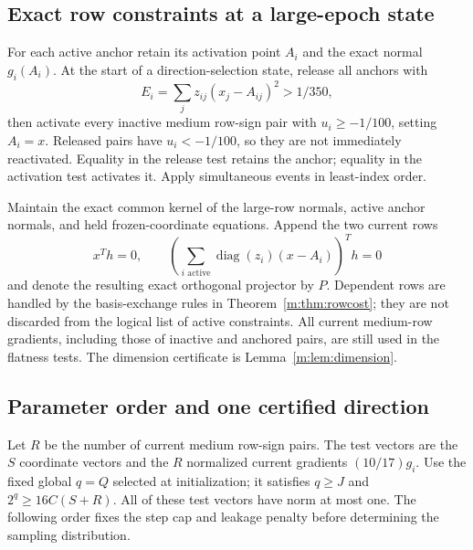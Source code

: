 \documentclass[11pt]{amsart}
\theoremstyle{definition}\newtheorem{definition}[theorem]{Definition}
\theoremstyle{remark}\newtheorem{remark}[theorem]{Remark}
\numberwithin{equation}{section}
\begin{document}
\subsection{Exact row constraints at a large-epoch state}\label{a:rows}
For each active anchor retain its activation point $A_i$ and the exact
normal $g_i(A_i)$. At the start of a direction-selection state, release all
anchors with
\[
 E_i=\sum_jz_{ij}(x_j-A_{ij})^2>1/350,
\]
then activate every inactive medium row-sign pair with $u_i\ge-1/100$,
setting $A_i=x$. Released pairs have $u_i<-1/100$, so they are not
immediately reactivated. Equality in the release test retains the anchor;
equality in the activation test activates it. Apply simultaneous events
in least-index order.

Maintain the exact common kernel of the large-row normals, active anchor
normals, and held frozen-coordinate equations. Append the two current
rows
\[
 x^Th=0,\qquad
 \left(\sum_{i\text{ active}}\operatorname{diag}(z_i)(x-A_i)\right)^Th=0
\]
and denote the resulting exact orthogonal projector by $P$.
Dependent rows are handled by the basis-exchange rules in
Theorem~\ref{m:thm:rowcost}; they are not discarded from the logical list
of active constraints. All current medium-row gradients, including those
of inactive and anchored pairs, are still used in the flatness tests.
The dimension certificate is Lemma~\ref{m:lem:dimension}.

\subsection{Parameter order and one certified direction}\label{a:direction}
Let $R$ be the number of current medium row-sign pairs. The test vectors
are the $S$ coordinate vectors and the $R$ normalized current gradients
$(10/17)g_i$. Use the fixed global $q=Q$ selected at initialization;
it satisfies $q\ge J$ and $2^q\ge16C(S+R)$. All of these test vectors
have norm at most one.
The following order fixes the step cap and leakage penalty before
determining the sampling distribution.
\end{document}
